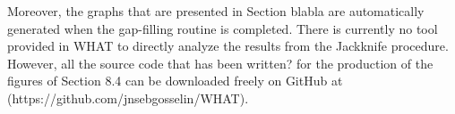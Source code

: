 \documentclass[TechnicalNoteMeteo.tex]{subfiles}
\begin{document}
Moreover, the graphs that are presented in Section blabla are automatically generated when the gap-filling routine is completed. There is currently no tool provided in WHAT to directly analyze the results from the Jackknife procedure. However, all the source code that has been written? for the production of the figures of Section 8.4 can be downloaded freely on GitHub at (https://github.com/jnsebgosselin/WHAT).
\end{document}
